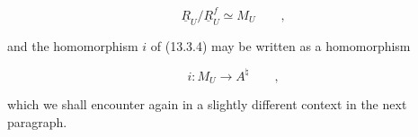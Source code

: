 \begin{equation}\tag{13.5.12}
 \underline R_U/\underline R^f_U\simeq M_U
 \qquad ,
\end{equation}

\noindent
and the homomorphism $i$ of (13.3.4) may be written as a homomorphism

\begin{equation}\tag{13.5.13}
 i:M_U\longrightarrow A^\natural
 \qquad ,
\end{equation}

\noindent
which we shall encounter again in a slightly different context in the
next paragraph.
